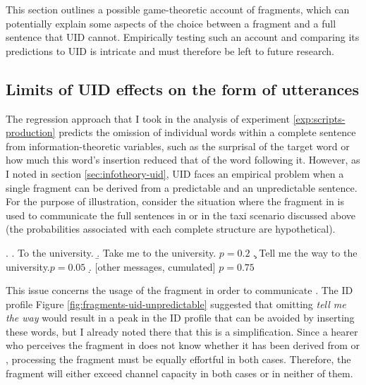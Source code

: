 This section outlines a possible game-theoretic account of fragments, which can potentially explain some aspects of the choice between a fragment and a full sentence that UID cannot. Empirically testing such an account and comparing its predictions to UID is intricate and must therefore be left to future research.

\subsection{Limits of UID effects on the form of utterances}

The regression approach that I took in the analysis of experiment \ref{exp:scripts-production} predicts the omission of individual words within a complete sentence from information-theoretic variables, such as the surprisal of the target word or how much this word's insertion reduced that of the word following it. However, as I noted in section \ref{sec:infotheory-uid}, UID faces an empirical problem when a single fragment can be derived from a predictable and an unpredictable sentence. For the purpose of illustration, consider the situation where the fragment in \Next[a] is used to communicate the full sentences in \Next[b] or \Next[c] in the taxi scenario discussed above (the probabilities associated with each complete structure are hypothetical).

\ex. \a. To the university.
    \b. Take me to the university. \hfill $p = 0.2$
    \c. Tell me the way to the university.\hfill $p = 0.05$
    \d. [other messages, cumulated] \hfill $p = 0.75$

This issue concerns the usage of the fragment in order to communicate \Last[c]. The ID profile Figure \ref{fig:fragments-uid-unpredictable} suggested that omitting \textit{tell me the way} would result in a peak in the ID profile that can be avoided by inserting these words, but I already noted there that this is a simplification. Since a hearer who perceives the fragment in \Last[a] does not know whether it has been derived from \Last[b] or \Last[c], processing the fragment must be equally effortful in both cases. Therefore, the fragment will either exceed channel capacity in both cases or in neither of them. %

